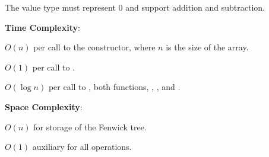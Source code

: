 The value type  must represent $0$ and support addition and subtraction.

\textbf{Time Complexity}:
\begin{compactitem}
  \item $O(n)$ per call to the constructor, where $n$ is the size of the array.
  \item $O(1)$ per call to .
  \item $O(\log n)$ per call to , both  functions, , , and .
\end{compactitem}

\textbf{Space Complexity}:
\begin{compactitem}
  \item $O(n)$ for storage of the Fenwick tree.
  \item $O(1)$ auxiliary for all operations.
\end{compactitem}

